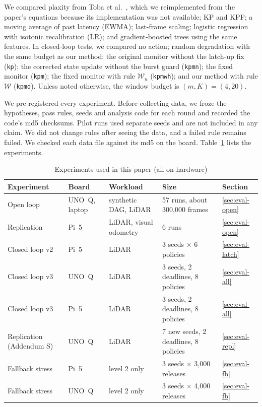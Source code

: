 \documentclass[acmsmall,screen]{acmart}
\newcommand{\pol}[1]{\texttt{#1}}
\newcommand{\Wu}{$\mathcal{W}_u$}
\newcommand{\Wl}{$\mathcal{W}$}
\begin{document}
We compared plaxity from Toba et al.~\cite{toba2026}, which we reimplemented from the paper's equations because its implementation was not available; KP and KPF; a moving average of past latency (EWMA); last-frame scaling; logistic regression with isotonic recalibration (LR); and gradient-boosted trees using the same features. In closed-loop tests, we compared no action; random degradation with the same budget as our method; the original monitor without the latch-up fix (\pol{kp}); the corrected state update without the burst guard (\pol{kpmn}); the fixed monitor (\pol{kpm}); the fixed monitor with rule \Wu{} (\pol{kpmwh}); and our method with rule \Wl{} (\pol{kpmd}). Unless noted otherwise, the window budget is $(m,K)=(4,20)$.

We pre-registered every experiment. Before collecting data, we froze the hypotheses, pass rules, seeds and analysis code for each round and recorded the code's md5 checksums. Pilot runs used separate seeds and are not included in any claim. We did not change rules after seeing the data, and a failed rule remains failed. We checked each data file against its md5 on the board. Table~\ref{tab:setup} lists the experiments.

\begin{table}[t]
\caption{Experiments used in this paper (all on hardware)}
\label{tab:setup}
\footnotesize
\begin{tabular}{@{}lllll@{}}
\toprule
Experiment & Board & Workload & Size & Section \\
\midrule
Open loop & UNO~Q, laptop & synthetic DAG, LiDAR & 57 runs, about 300{,}000 frames & \ref{sec:eval-open} \\
Replication & Pi~5 & LiDAR, visual odometry & 6 runs & \ref{sec:eval-open} \\
Closed loop v2 & Pi~5 & LiDAR & 3 seeds $\times$ 6 policies & \ref{sec:eval-latch} \\
Closed loop v3 & UNO~Q & LiDAR & 3 seeds, 2 deadlines, 8 policies & \ref{sec:eval-all} \\
Closed loop v3 & Pi~5 & LiDAR & 3 seeds, 2 deadlines, 8 policies & \ref{sec:eval-all} \\
Replication (Addendum S) & UNO~Q & LiDAR & 7 new seeds, 2 deadlines, 8 policies & \ref{sec:eval-repl} \\
Fallback stress & Pi~5 & level 2 only & 3 seeds $\times$ 3{,}000 releases & \ref{sec:eval-fb} \\
Fallback stress & UNO~Q & level 2 only & 3 seeds $\times$ 4{,}000 releases & \ref{sec:eval-fb} \\
\bottomrule
\end{tabular}
\end{table}
\end{document}

